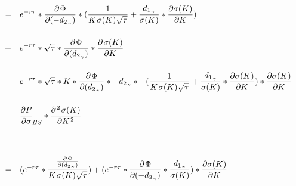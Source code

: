 \documentclass[12pt]{article}
\begin{document}
{\begin{align*}
\\[35pt]
\hspace{3pt} &= \hspace{7pt}   e^{-r \tau} * \frac{\partial \hspace{1pt} \Phi}{\partial (-d_{2_{\hspace{1pt} \gamma}})} * (\frac{1}{K \hspace{1pt} \sigma(K) \sqrt{\tau}} + \frac{d_{1_{\hspace{1pt} \gamma}}}{\sigma(K)} * \frac{\partial \sigma(K)}{\partial K})
\\[12pt]
&+ \hspace{8pt}   e^{-r \tau} * \sqrt{\tau} * \frac{\partial \hspace{1pt} \Phi}{\partial (d_{2_{\hspace{1pt} \gamma}})} * \frac{\partial \hspace{1pt} \sigma(K)}{\partial K}
\\[12pt]
&+ \hspace{8pt}   e^{-r \tau} * \sqrt{\tau} * K * \frac{\partial \hspace{1pt} \Phi}{\partial (d_{2_{\hspace{1pt} \gamma}})} * -d_{2_{\hspace{1pt} \gamma}} * -(\frac{1}{K \hspace{1pt} \sigma(K) \sqrt{\tau}} + \frac{d_{1_{\hspace{1pt} \gamma}}}{\sigma(K)} * \frac{\partial \sigma(K)}{\partial K}) * \frac{\partial \sigma(K)}{\partial K}
\\[12pt]
&+ \hspace{8pt}   \frac{\partial P}{\partial \sigma}_{\hspace{-1pt} BS} * \frac{\partial^{\hspace{1pt} 2} \hspace{1pt} \sigma(K)}{\partial K^{\hspace{1pt} 2}}
\\[35pt]
\hspace{3pt} &= \hspace{7pt}   (e^{-r \tau} * \frac{\frac{\partial \hspace{1pt} \Phi}{\partial (d_{2_{\hspace{1pt} \gamma}})}}{K \hspace{1pt} \sigma(K) \sqrt{\tau}}) + (e^{-r \tau} * \frac{\partial \hspace{1pt} \Phi}{\partial (-d_{2_{\hspace{1pt} \gamma}})} * \frac{d_{1_{\hspace{1pt} \gamma}}}{\sigma(K)}) * \frac{\partial \sigma(K)}{\partial K}

\end{align*}}
\end{document}
